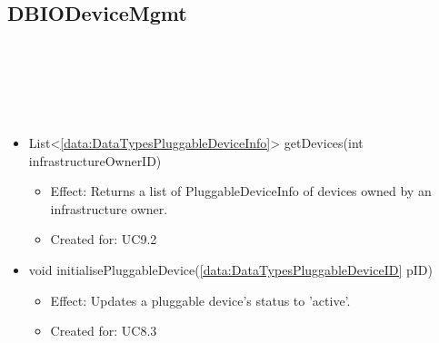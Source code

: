   \subsection{DBIODeviceMgmt}\label{int:DeviceDatabaseDeviceDBDBIODeviceMgmt}
    \begin{description}
      \item[Provided by:] \iconcomponent{}~
      \item[Required by:] \iconcomponent{}~
      \item[Operations:] ~
    \begin{itemize}[noitemsep,nolistsep,leftmargin=-.25cm]
      \item \textsf{List\textless{}\ref{data:DataTypesPluggableDeviceInfo}\textgreater{} getDevices(int infrastructureOwnerID)}
        \begin{itemize}[noitemsep,nolistsep]
           \item Effect: Returns a list of PluggableDeviceInfo of devices owned by an infrastructure owner.
\item Created for: UC9.2
        \end{itemize}
      \item \textsf{void initialisePluggableDevice(\ref{data:DataTypesPluggableDeviceID} pID)}
        \begin{itemize}[noitemsep,nolistsep]
           \item Effect: Updates a pluggable device's status to 'active'.
\item Created for: UC8.3
        \end{itemize}
    \end{itemize}
    \end{description}

